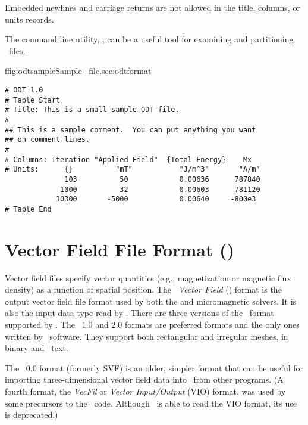Embedded newlines and carriage returns are not allowed in the title,
columns, or units records.

The command line utility, 
,
can be a useful tool for examining and partitioning \ODT\ files.

\begin{codelisting}{f}{fig:odtsample}{Sample \ODT\ file.}{sec:odtformat}
\begin{verbatim}
# ODT 1.0
# Table Start
# Title: This is a small sample ODT file.
#
## This is a sample comment.  You can put anything you want
## on comment lines.
#
# Columns: Iteration "Applied Field"  {Total Energy}    Mx
# Units:      {}          "mT"           "J/m^3"       "A/m"
              103          50            0.00636      787840
             1000          32            0.00603      781120
            10300       -5000            0.00640     -800e3
# Table End
\end{verbatim}
\end{codelisting}


\section{Vector Field File Format (\OVF)}\label{sec:vfformats}
Vector field files specify vector quantities
(e.g., magnetization or magnetic flux density) as a function of spatial
position.  The \textit{\OOMMF\ Vector Field} (\OVF) format is the output
vector field file format used by both the
 and
micromagnetic solvers.  It is also the input data type read by
.  There
are three versions of the \OVF\ format supported by \OOMMF.  The
\OVF~1.0 and 2.0 formats are preferred formats and the only ones
written by \OOMMF\ software.  They support both rectangular and
irregular meshes, in binary and \ASCII\ text.

The \OVF~0.0 format (formerly SVF)
is an older, simpler format that can be useful for importing
three-dimensional vector
field data into \OOMMF\ from other programs.  (A fourth format, the
\textit{VecFil} or \textit{Vector Input/Output}
(VIO) format, was used by some precursors to the \OOMMF\
code.  Although \OOMMF\ is able to read the VIO format, its use is
deprecated.)

